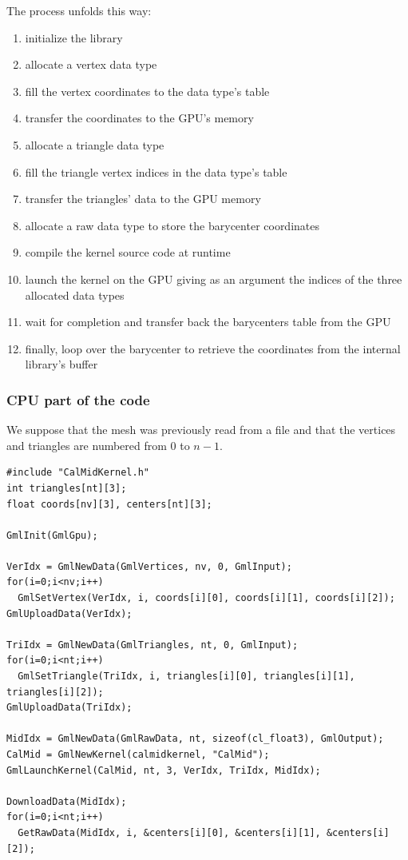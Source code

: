 \documentclass[a4paper,12pt]{article}
\begin{document}
The process unfolds this way:
\begin{enumerate}
\item initialize the library
\item allocate a vertex data type
\item fill the vertex coordinates to the data type's table
\item transfer the coordinates to the GPU's memory
\item allocate a triangle data type
\item fill the triangle vertex indices in the data type's table
\item transfer the triangles' data to the GPU memory
\item allocate a raw data type to store the barycenter coordinates
\item compile the kernel source code at runtime
\item launch the kernel on the GPU giving as an argument the indices of the three allocated data types
\item wait for completion and transfer back the barycenters table from the GPU
\item finally, loop over the barycenter to retrieve the coordinates from the internal library's buffer
\end{enumerate}

\subsubsection{CPU part of the code}
We suppose that the mesh was previously read from a file and that the vertices and triangles are numbered from 0 to $n-1$.

\begin{tt}
\begin{verbatim}
#include "CalMidKernel.h"
int triangles[nt][3];
float coords[nv][3], centers[nt][3];

GmlInit(GmlGpu);

VerIdx = GmlNewData(GmlVertices, nv, 0, GmlInput);
for(i=0;i<nv;i++)
  GmlSetVertex(VerIdx, i, coords[i][0], coords[i][1], coords[i][2]);
GmlUploadData(VerIdx);

TriIdx = GmlNewData(GmlTriangles, nt, 0, GmlInput);
for(i=0;i<nt;i++)
  GmlSetTriangle(TriIdx, i, triangles[i][0], triangles[i][1], triangles[i][2]);
GmlUploadData(TriIdx);

MidIdx = GmlNewData(GmlRawData, nt, sizeof(cl_float3), GmlOutput);
CalMid = GmlNewKernel(calmidkernel, "CalMid");
GmlLaunchKernel(CalMid, nt, 3, VerIdx, TriIdx, MidIdx);

DownloadData(MidIdx);
for(i=0;i<nt;i++)
  GetRawData(MidIdx, i, &centers[i][0], &centers[i][1], &centers[i][2]);
\end{verbatim}
\end{tt}
\normalfont
\end{document}
